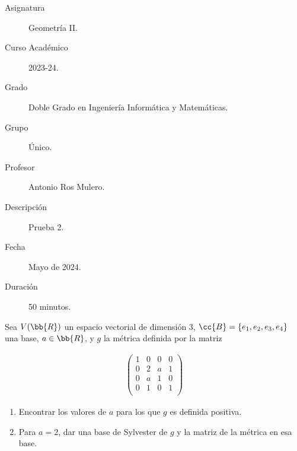 \documentclass[12pt]{article}
\begin{document}

    
    

    \begin{description}
        \item[Asignatura] Geometría II.
        \item[Curso Académico] 2023-24.
        \item[Grado] Doble Grado en Ingeniería Informática y Matemáticas.
        \item[Grupo] Único.
        \item[Profesor] Antonio Ros Mulero.
        \item[Descripción] Prueba 2.
        \item[Fecha] Mayo de 2024.
        \item[Duración] 50 minutos.
    \end{description}
    \newpage

    \begin{ejercicio}
        Sea $V(\bb{R})$ un espacio vectorial de dimensión 3, $\cc{B}=\{e_1,e_2,e_3,e_4\}$ una base, $a \in \bb{R}$, y $g$ la métrica definida por la matriz

        \begin{gather*}
            \begin{pmatrix}
                1 & 0 & 0 & 0 \\
                0 & 2 & a & 1 \\
                0 & a & 1 & 0 \\
                0 & 1 & 0 & 1 \\
            \end{pmatrix}
        \end{gather*}

        \begin{enumerate}
            \item Encontrar los valores de $a$ para los que $g$ es definida positiva.
            \item Para $a=2$, dar una base de Sylvester de $g$ y la matriz de la métrica en esa base.
        \end{enumerate}
    \end{ejercicio}
\end{document}
